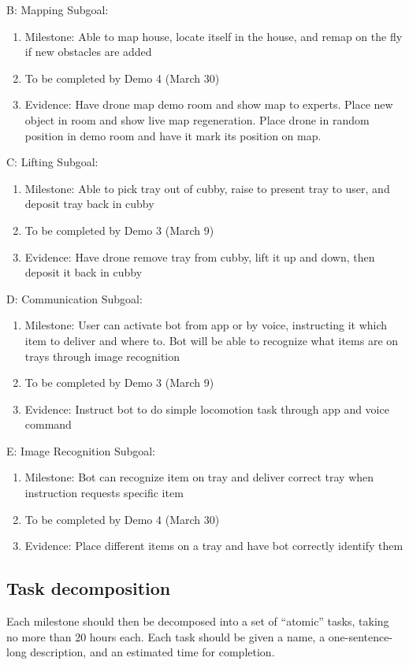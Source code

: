 \documentclass{article}
\begin{document}
B: Mapping Subgoal:
\begin{enumerate}
\item Milestone: Able to map house, locate itself in the house, and remap on the fly if new obstacles are added
\item To be completed by Demo 4 (March 30)
\item Evidence: Have drone map demo room and show map to experts. Place new object in room and show live map regeneration. Place drone in random position in demo room and have it mark its position on map.
\end{enumerate}
C: Lifting Subgoal:
\begin{enumerate}
\item Milestone: Able to pick tray out of cubby, raise to present tray to user, and deposit tray back in cubby
\item To be completed by Demo 3 (March 9)
\item Evidence: Have drone remove tray from cubby, lift it up and down, then deposit it back in cubby
\end{enumerate}
D: Communication Subgoal:
\begin{enumerate}
\item Milestone: User can activate bot from app or by voice, instructing it which item to deliver and where to. Bot will be able to recognize what items are on trays through image recognition
\item To be completed by Demo 3 (March 9)
\item Evidence: Instruct bot to do simple locomotion task through app and voice command
\end{enumerate}
E: Image Recognition Subgoal:
\begin{enumerate}
\item Milestone: Bot can recognize item on tray and deliver correct tray when instruction requests specific item
\item To be completed by Demo 4 (March 30)
\item Evidence: Place different items on a tray and have bot correctly identify them
\end{enumerate}


\subsection{Task decomposition} 
Each milestone should then be decomposed into a set of ``atomic'' tasks, taking no more than 20 hours each. Each task should be given a name, a one-sentence-long description, and an estimated time for completion.
\end{document}
